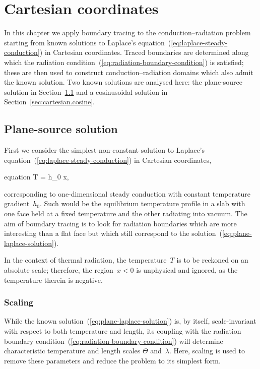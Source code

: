 \chapter{Cartesian coordinates}
\label{ch:cartesian}

In this chapter
we apply boundary tracing to the conduction--radiation problem
starting from known solutions
to Laplace's equation~(\ref{eq:laplace-steady-conduction})
in Cartesian coordinates.
Traced boundaries are determined along which
the radiation condition~(\ref{eq:radiation-boundary-condition})
is satisfied;
these are then used to construct conduction--radiation domains
which also admit the known solution.
Two known solutions are analysed here:
the plane-source solution in Section~\ref{sec:cartesian.plane}
and a cosinusoidal solution in Section~\ref{sec:cartesian.cosine}.

\section{Plane-source solution}
\label{sec:cartesian.plane}

First we consider the simplest non-constant solution
to Laplace's equation~(\ref{eq:laplace-steady-conduction})
in Cartesian coordinates,
\begin{important}{equation}
  T = h_0 x,
  \label{eq:plane-laplace-solution}
\end{important}
corresponding to one-dimensional steady conduction
with constant temperature gradient~$h_0$.
Such would be the equilibrium temperature profile in a slab
with one face held at a fixed temperature
and the other radiating into vacuum.
The aim of boundary tracing is to look for radiation boundaries
which are more interesting than a flat face
but which still correspond to the solution~(\ref{eq:plane-laplace-solution}).

In the context of thermal radiation,
the temperature~$T$ is to be reckoned on an absolute scale;
therefore, the region~$x < 0$ is unphysical and ignored,
as the temperature therein is negative.

\subsection{Scaling}
\label{sec:cartesian.plane.scaling}

While the known solution~(\ref{eq:plane-laplace-solution}) is, by itself,
scale-invariant with respect to both temperature and length,
its coupling with
the radiation boundary condition~(\ref{eq:radiation-boundary-condition})
will determine characteristic temperature and length scales
$\Theta$ and~$\lambda$.
Here, scaling is used to remove these parameters
and reduce the problem to its simplest form.

